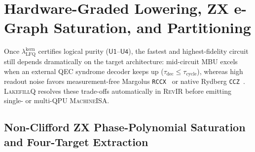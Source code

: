 \documentclass[acmsmall,screen,anonymous]{acmart}
\DeclareRobustCommand{\_}{\ifmmode\text{\char95}\else\char95\penalty0\relax\fi}
\theoremstyle{plain}
\newcommand{\LakefillQ}{\textsc{LakefillQ}}
\newcommand{\RevIR}{\textsc{RevIR}}
\newcommand{\MachineISA}{\textsc{MachineISA}}
\begin{document}
\section{Hardware-Graded Lowering, ZX e-Graph Saturation, and Partitioning}
\label{sec:compiler}

Once $\lambda_{\mathrm{LFQ}}^{\mathrm{kern}}$ certifies logical purity ($\mathsf{U1}$--$\mathsf{U4}$), the fastest and highest-fidelity circuit still depends dramatically on the target architecture: mid-circuit MBU excels when an external QEC syndrome decoder keeps up ($\tau_{\mathrm{dec}} \le \tau_{\mathrm{cycle}}$), whereas high readout noise favors measurement-free Margolus \texttt{RCCX}~\cite{maslov2016} or native Rydberg \texttt{CCZ}~\cite{bluvstein2024}. \LakefillQ{} resolves these trade-offs automatically in \RevIR{} before emitting single- or multi-QPU \MachineISA{}.

\subsection{Non-Clifford ZX Phase-Polynomial Saturation and Four-Target Extraction}
\label{sec:egraph}
\end{document}
